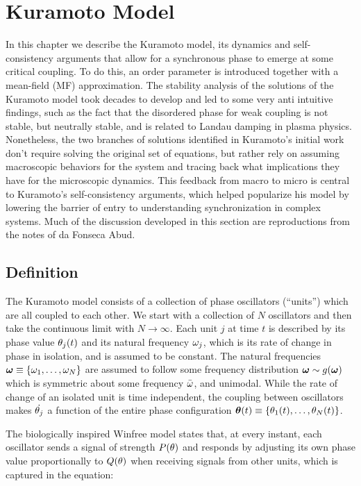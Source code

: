 \chapter{Kuramoto Model}
\label{chap:kuramoto}


In this chapter we describe the Kuramoto model, its dynamics and self-consistency arguments that allow for a synchronous phase to
emerge at some critical coupling. To do this, an order parameter is introduced together with a mean-field (MF) approximation. The
stability analysis of the solutions of the Kuramoto model took decades to develop and led to some very anti intuitive findings, such as
the fact that the disordered phase for weak coupling is not stable, but neutrally stable, and is related to Landau damping in plasma
physics.  Nonetheless, the two branches of solutions identified in Kuramoto's initial work don't require solving the original set of
equations, but rather rely on assuming macroscopic behaviors for the system and tracing back what implications they have for the
microscopic dynamics.  This feedback from macro to micro is central to Kuramoto's self-consistency arguments, which helped popularize
his model by lowering the barrier of entry to understanding synchronization in complex systems. Much of the discussion developed in
this section are reproductions from the notes of da Fonseca Abud\cite{da_Fonseca_2018}.


\section{Definition}

The Kuramoto model consists of a collection of phase oscillators (``units'') which are all coupled to each other. We start with a
collection of $N$ oscillators and then take the continuous limit with $N \to \infty$. Each unit $j$ at time $t$ is described by its
phase value $\theta_j(t)$ and its natural frequency $\omega_j$, which is its rate of change in phase in isolation, and is assumed to be
constant. The natural frequencies $\bm{\omega}\equiv \{\omega_1,\dots,\omega_N\}$ are assumed to follow some frequency distribution
$\bm{\omega} \sim g(\bm{\omega})$ which is symmetric about some frequency $\bar{\omega}$, and unimodal. While the rate of change of
an isolated unit is time independent, the coupling between oscillators makes $\dot{\theta_j}$ a function of the entire phase
configuration $\bm{\theta}(t) \equiv \{ \theta_1(t), \dots, \theta_N(t)\}$.

The biologically inspired Winfree model states that, at every instant, each oscillator sends a signal of strength $P(\theta)$ and
responds by adjusting its own phase value proportionally to $Q(\theta)$ when receiving signals from other units, which is captured in
the equation:

